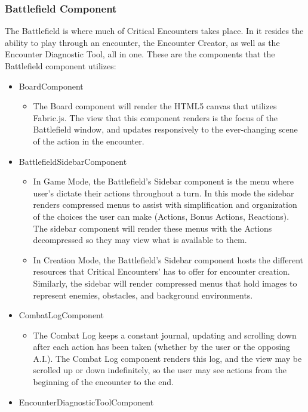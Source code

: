 \documentclass[12pt,a4paper]{report}
\begin{document}
		\subsubsection{Battlefield Component}
		The Battlefield is where much of Critical Encounters takes place. In it resides the ability to play through an encounter, the Encounter Creator, as well as the Encounter Diagnostic Tool, all in one. These are the components that the Battlefield component utilizes:
		\begin{itemize}
			\item BoardComponent
			\begin{itemize}
				\item The Board component will render the HTML5 canvas that utilizes Fabric.js. The view that this component renders is the focus of the Battlefield window, and updates responsively to the ever-changing scene of the action in the encounter.
			\end{itemize}
			\item BattlefieldSidebarComponent
			\begin{itemize}
				\item In Game Mode, the Battlefield's Sidebar component is the menu where user's dictate their actions throughout a turn. In this mode the sidebar renders compressed menus to assist with simplification and organization of the choices the user can make (Actions, Bonus Actions, Reactions). The sidebar component will render these menus with the Actions decompressed so they may view what is available to them.
				\item In Creation Mode, the Battlefield's Sidebar component hosts the different resources that Critical Encounters' has to offer for encounter creation. Similarly, the sidebar will render compressed menus that hold images to represent enemies, obstacles, and background environments.
			\end{itemize}
			\item CombatLogComponent
			\begin{itemize}
				\item The Combat Log keeps a constant journal, updating and scrolling down after each action has been taken (whether by the user or the opposing A.I.). The Combat Log component renders this log, and the view may be scrolled up or down indefinitely, so the user may see actions from the beginning of the encounter to the end.
			\end{itemize}
			\item EncounterDiagnosticToolComponent
			\begin{itemize}

\end{itemize}
\end{itemize}
\end{document}
